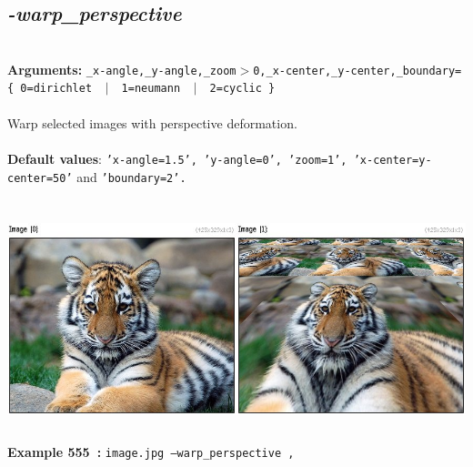 \documentclass[a4paper,11pt,twoside]{book}
\begin{document}
\subsection{\emph{-warp\_perspective} }\vspace*{-0.5em}
~\\\textbf{Arguments: } 
{\small \texttt{\_x-angle,\_y-angle,\_zoom$>$0,\_x-center,\_y-center,\_boundary=\{ 0=dirichlet ~$|$~ 1=neumann ~$|$~ 2=cyclic \}}}\\~\\
Warp selected images with perspective deformation.
~\\~\\\textbf{Default values}: {\small \texttt{'x-angle=1.5', 'y-angle=0', 'zoom=1', 'x-center=y-center=50'} and \texttt{'boundary=2'.}}
\begin{center}\includegraphics[keepaspectratio=true,height=7cm,width=\textwidth]{img/gmic_def555.jpg}\\
{\footnotesize \textbf{Example 555~:} \texttt{image.jpg --warp\_perspective ,}}
\end{center}
\end{document}
